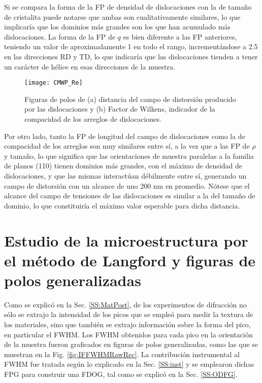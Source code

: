 Si se compara la forma de la FP de densidad de dislocaciones con la de tamaño de cristalita puede notarse que ambas son cualitativamente similares, lo que implicaría que los dominios más grandes son los que han acumulado más dislocaciones.
La forma de la FP de $q$ es bien diferente a las FP anteriores, teniendo un valor de aproximadamente 1 en todo el rango, incrementándose a 2.5 en las direcciones RD y TD, lo que indicaría que las dislocaciones tienden a tener un carácter de hélice en esas direcciones de la muestra.

\begin{figure}[!htb]
  \centering
  \texttt{[image: CMWP\_Re]}
  \caption{Figuras de polos de (a) distancia del campo de distorsión producido por las dislocaciones y (b) Factor de Wilkens, indicador de la compacidad de los arreglos de dislocaciones.}
  \label{fig:IFCMWPRe}
\end{figure}

Por otro lado, tanto la FP de longitud del campo de dislocaciones como la de compacidad de los arreglos son muy similares entre sí, a la vez que a las FP de $\rho$ y tamaño, lo que significa que las orientaciones de muestra paralelas a la familia de planos (110) tienen dominios más grandes, con el máximo de densidad de dislocaciones, y que las mismas interactúan débilmente entre sí, generando un campo de distorsión con un alcance de uno 200 nm en promedio. Nótese que el alcance del campo de tensiones de las dislocaciones es similar a la del tamaño de dominio, lo que constituiría el máximo valor esperable para dicha distancia.

\section{Estudio de la microestructura por el método de Langford y figuras de polos generalizadas}\label{S:IFLANG}
Como se explicó en la Sec. \ref{SS:MatPost}, de los experimentos de difracción no sólo se extrajo la intensidad de los picos que se empleó para medir la textura de los materiales, sino que también se extrajo información sobre la forma del pico, en particular el FWHM.
Los FWHM obtenidos para cada pico en la orientación de la muestra fueron graficados en figuras de polos generalizadas, como las que se muestran en la Fig. \ref{fig:IFFWHMRawRec}.
La contribución instrumental al FWHM fue tratada según lo explicado en la Sec. \ref{SS:inst} y se emplearon dichas FPG para construir una FDOG, tal como se explicó en la Sec. \ref{SS:ODFG}.


